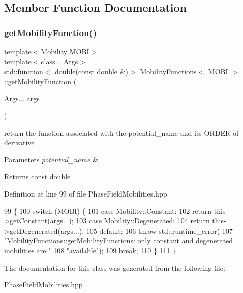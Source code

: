 \subsection{Member Function Documentation}
\mbox{\label{classMobilityFunctions_a25741d28fd09272b2647f5af944aa748}} 
\subsubsection{\texorpdfstring{get\+Mobility\+Function()}{getMobilityFunction()}}
{\footnotesize\ttfamily template$<$Mobility M\+O\+BI$>$ \\
template$<$class... Args$>$ \\
std\+::function$<$ double(const double \&)$>$ \hyperlink{classMobilityFunctions}{Mobility\+Functions}$<$ M\+O\+BI $>$\+::get\+Mobility\+Function (\begin{DoxyParamCaption}\item[{Args...}]{args }\end{DoxyParamCaption})}



return the function associated with the potential\+\_\+name and its O\+R\+D\+ER of derivative 


\begin{DoxyParams}{Parameters}
{\em potential\+\_\+name} & \\
\hline
\end{DoxyParams}
\begin{DoxyReturn}{Returns}
const double 
\end{DoxyReturn}


Definition at line 99 of file Phase\+Field\+Mobilities.\+hpp.


\begin{DoxyCode}
99                                                                                             \{
100   \textcolor{keywordflow}{switch} (MOBI) \{
101     \textcolor{keywordflow}{case} Mobility::Constant:
102       \textcolor{keywordflow}{return} this->getConstant(args...);
103     \textcolor{keywordflow}{case} Mobility::Degenerated:
104       \textcolor{keywordflow}{return} this->getDegenerated(args...);
105     \textcolor{keywordflow}{default}:
106       \textcolor{keywordflow}{throw} std::runtime\_error(
107           \textcolor{stringliteral}{"MobilityFunctions::getMobilityFunctions: only constant and degenerated mobilities  are "}
108           \textcolor{stringliteral}{"available"});
109       \textcolor{keywordflow}{break};
110   \}
111 \}
\end{DoxyCode}


The documentation for this class was generated from the following file\+:\begin{DoxyCompactItemize}
\item 
Phase\+Field\+Mobilities.\+hpp\end{DoxyCompactItemize}
